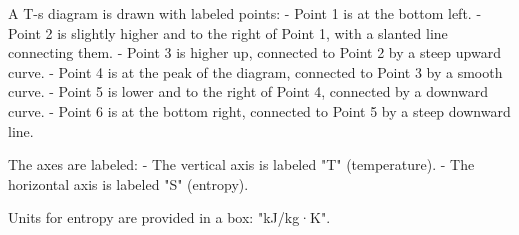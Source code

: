 A T-s diagram is drawn with labeled points:  
- Point 1 is at the bottom left.  
- Point 2 is slightly higher and to the right of Point 1, with a slanted line connecting them.  
- Point 3 is higher up, connected to Point 2 by a steep upward curve.  
- Point 4 is at the peak of the diagram, connected to Point 3 by a smooth curve.  
- Point 5 is lower and to the right of Point 4, connected by a downward curve.  
- Point 6 is at the bottom right, connected to Point 5 by a steep downward line.  

The axes are labeled:  
- The vertical axis is labeled "T" (temperature).  
- The horizontal axis is labeled "S" (entropy).  

Units for entropy are provided in a box: "kJ/kg·K".